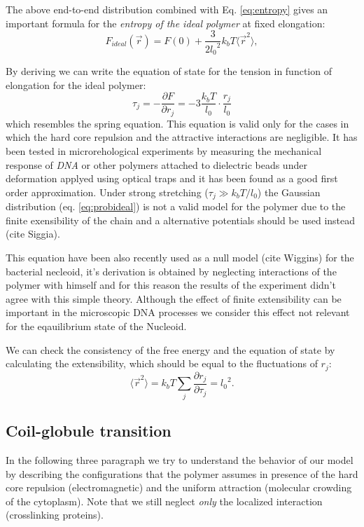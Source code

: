 \documentclass[12pt,a4paper,notitlepage]{article}
\newcommand{\dna}{\emph{DNA}\xspace}
\begin{document}
The above end-to-end distribution combined with Eq. \ref{eq:entropy}
gives an important formula for the {\it entropy of the ideal polymer}
at fixed elongation:
\begin{equation}
  F_{ideal}(\vec r) = F(0) + \frac{3}{2 {l_0}^2} k_b T 
  \langle \vec r^2 \rangle,
\label{sideal}
\end{equation}

By deriving we can write the equation of state for the tension in
function of elongation for the ideal polymer:
\begin{equation}
  \tau_j = - \frac{\partial F}{\partial r_j} = - 3 \frac{k_b T}{l_0}
  \cdot \frac{r_j}{l_0}
\end{equation}
which resembles the spring equation. This equation is valid only for
the cases in which the hard core repulsion and the attractive
interactions are negligible. It has been tested in
microrehological experiments by measuring the mechanical response of
\dna or other polymers attached to dielectric beads under deformation
applyed using optical traps and it has been found as a good first
order approximation. Under strong stretching ($\tau_j \gg k_b T / l_0$)
the Gaussian distribution (eq. \ref{eq:probideal}) is not a valid
model for the polymer due to the finite exensibility of the chain and
a alternative potentials should be used instead (cite Siggia).

This equation have been also recently used as a null model (cite
Wiggins) for the bacterial necleoid, it's derivation is obtained by
neglecting interactions of the polymer with himself and for this
reason the results of the experiment didn't agree with this simple
theory. Although the effect of finite extensibility can be important
in the microscopic DNA processes we consider this effect not relevant
for the eqauilibrium state of the Nucleoid.

We can check the consistency of the free energy and the equation of state
by calculating the extensibility, which should be equal to the fluctuations
of $r_j$:
\begin{equation}
  \langle \vec r^2 \rangle = k_b T \sum_j \frac{\partial r_j}{\partial
    \tau_j}  = {l_0}^2.
\end{equation}

\subsection{Coil-globule transition}

In the following three paragraph we try to understand the behavior of
our model by describing the configurations that the polymer assumes in
presence of the hard core repulsion (electromagnetic) and the uniform
attraction (molecular crowding of the cytoplasm). Note that
we still neglect {\it only} the localized interaction (crosslinking
proteins).
\end{document}
